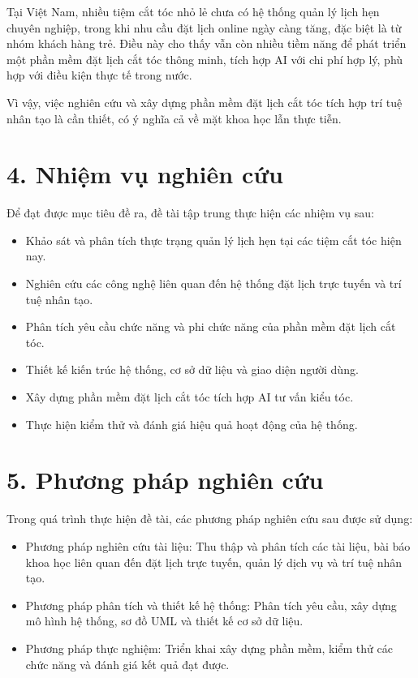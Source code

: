 Tại Việt Nam, nhiều tiệm cắt tóc nhỏ lẻ chưa có hệ thống quản lý lịch hẹn chuyên nghiệp, trong khi nhu cầu đặt lịch online ngày càng tăng, đặc biệt là từ nhóm khách hàng trẻ. Điều này cho thấy vẫn còn nhiều tiềm năng để phát triển một phần mềm đặt lịch cắt tóc thông minh, tích hợp AI với chi phí hợp lý, phù hợp với điều kiện thực tế trong nước.

Vì vậy, việc nghiên cứu và xây dựng phần mềm đặt lịch cắt tóc tích hợp trí tuệ nhân tạo là cần thiết, có ý nghĩa cả về mặt khoa học lẫn thực tiễn.

\section*{4. Nhiệm vụ nghiên cứu}
Để đạt được mục tiêu đề ra, đề tài tập trung thực hiện các nhiệm vụ sau:
\begin{itemize}
    \item Khảo sát và phân tích thực trạng quản lý lịch hẹn tại các tiệm cắt tóc hiện nay.
    \item Nghiên cứu các công nghệ liên quan đến hệ thống đặt lịch trực tuyến và trí tuệ nhân tạo.
    \item Phân tích yêu cầu chức năng và phi chức năng của phần mềm đặt lịch cắt tóc.
    \item Thiết kế kiến trúc hệ thống, cơ sở dữ liệu và giao diện người dùng.
    \item Xây dựng phần mềm đặt lịch cắt tóc tích hợp AI tư vấn kiểu tóc.
    \item Thực hiện kiểm thử và đánh giá hiệu quả hoạt động của hệ thống.
\end{itemize}

\section*{5. Phương pháp nghiên cứu}
Trong quá trình thực hiện đề tài, các phương pháp nghiên cứu sau được sử dụng:
\begin{itemize}
    \item Phương pháp nghiên cứu tài liệu: Thu thập và phân tích các tài liệu, bài báo khoa học liên quan đến đặt lịch trực tuyến, quản lý dịch vụ và trí tuệ nhân tạo.
    \item Phương pháp phân tích và thiết kế hệ thống: Phân tích yêu cầu, xây dựng mô hình hệ thống, sơ đồ UML và thiết kế cơ sở dữ liệu.
    \item Phương pháp thực nghiệm: Triển khai xây dựng phần mềm, kiểm thử các chức năng và đánh giá kết quả đạt được.
\end{itemize}

